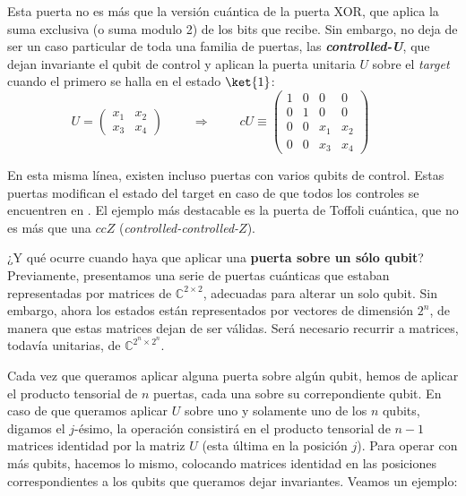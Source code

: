 \documentclass[11pt,a4paper,twoside,pdf]{article}
\numberwithin{equation}{section}
\begin{document}
			Esta puerta no es más que la versión cuántica de la puerta XOR, que aplica la suma exclusiva (o suma modulo 2) de los bits que recibe. Sin embargo, no deja de ser un caso particular de toda una familia de puertas, las \textbf{\textit{controlled-U}}, que dejan invariante el qubit de control y aplican la puerta unitaria $U$ sobre el \textit{target} cuando el primero se halla en el estado $\ket{1}$:
				\begin{equation} \label{eq: C-U}
					U = \left(\begin{array}{cc}
					x_1 & x_2 \\
					x_3 & x_4 
					\end{array}\right)											\qquad \;	\Rightarrow 	\;\qquad
					cU \equiv \left(\begin{array}{cccc}
					1 & 0 &   0   &   0		\\
					0 & 1 &   0   &   0	    \\
					0 & 0 & x_1  & x_2 	   \\
					0 & 0 & x_3 & x_4 
					\end{array}\right)							 \qquad 	
				\end{equation}
				
			En esta misma línea, existen incluso puertas con varios qubits de control. Estas puertas modifican el estado del target en caso de que todos los controles se encuentren en . El ejemplo más destacable es la puerta de Toffoli cuántica, que no es más que una $ccZ$ (\textit{controlled-controlled-}$Z$).
		
			¿Y qué ocurre cuando haya que aplicar una \textbf{puerta sobre un sólo qubit}? Previamente, presentamos una serie de puertas cuánticas que estaban representadas por matrices de $\mathbb{C}^{2\times 2}$, adecuadas para alterar un solo qubit. Sin embargo, ahora los estados están representados por vectores de dimensión $2^n$, de manera que estas matrices dejan de ser válidas. Será necesario recurrir a matrices, todavía unitarias, de $\mathbb{C}^{2^n\times2^n}$.
		
			Cada vez que queramos aplicar alguna puerta sobre algún qubit, hemos de aplicar el producto tensorial de $n$ puertas, cada una sobre su correpondiente qubit. En caso de que queramos aplicar $U$ sobre uno y solamente uno de los $n$ qubits, digamos el $j$-ésimo, la operación consistirá en el producto tensorial de $n-1$ matrices identidad por la matriz $U$ (esta última en la posición $j$). Para operar con más qubits, hacemos lo mismo, colocando matrices identidad en las posiciones correspondientes a los qubits que queramos dejar invariantes. Veamos un ejemplo: 
		
\end{document}
